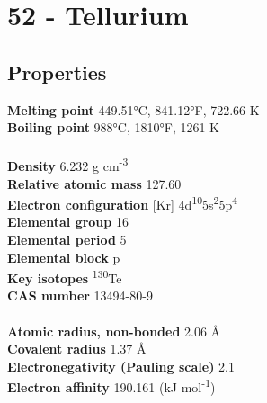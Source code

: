 \section{52 - Tellurium}
\label{sec:elem-tellurium}
\subsection{Properties}
\textbf{Melting point} 449.51°C, 841.12°F, 722.66 K\\
\textbf{Boiling point} 988°C, 1810°F, 1261 K\\
\\
\textbf{Density} 6.232 g cm\textsuperscript{-3}\\
\textbf{Relative atomic mass} 127.60\\
\textbf{Electron configuration} [Kr] 4d\textsuperscript{10}5s\textsuperscript{2}5p\textsuperscript{4}\\
\textbf{Elemental group} 16\\
\textbf{Elemental period} 5\\
\textbf{Elemental block} p\\
\textbf{Key isotopes} \textsuperscript{130}Te\\
\textbf{CAS number} 13494-80-9\\
\\
\textbf{Atomic radius, non-bonded} 2.06 Å\\
\textbf{Covalent radius} 1.37 Å\\
\textbf{Electronegativity (Pauling scale)} 2.1\\
\textbf{Electron affinity} 190.161 (kJ mol\textsuperscript{-1})\\